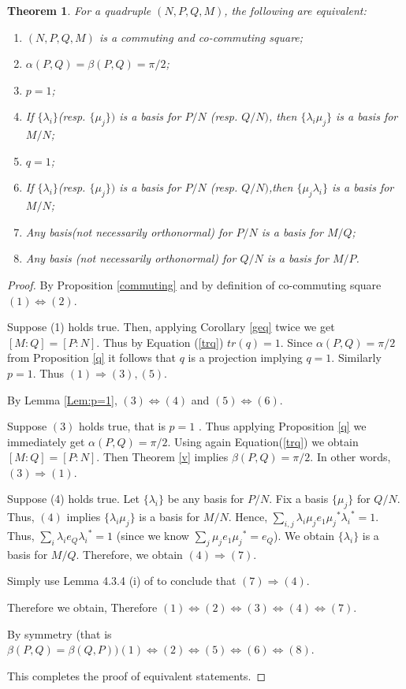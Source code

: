 \documentclass[11pt,letterpaper]{amsart}
\newtheorem{theorem}{Theorem}[section]
\theoremstyle{definition}
\theoremstyle{remark}
\begin{document}
\begin{theorem}\label{sym}
 For a quadruple $(N,P,Q,M)$, the following are equivalent:
 \begin{enumerate}
  \item $(N,P,Q,M)$ is a commuting and co-commuting square; 
  \item  $\alpha(P,Q)= \beta(P,Q)= \pi/2$;
  \item $p=1$;
  \item  If $\{\lambda_i\}$(resp. $\{\mu_j\})$ is a basis for $P/N$ (resp. $Q/N)$, then $ \{\lambda_i \mu_j\}$ is a basis for $M/N$;
  \item $q=1$;
  \item  If $\{\lambda_i\}$(resp. $\{\mu_j\})$ is a basis for $P/N$ (resp. $Q/N)$,then  $ \{\mu_j \lambda_i\}$ is a basis for $M/N$;
  
  \item  Any basis(not necessarily orthonormal) for $P/N$ is a basis for $M/Q$;
  \item  Any basis (not necessarily orthonormal) for $Q/N$ is a basis for $M/P$.
         
 \end{enumerate}
 \end{theorem}
 
 \begin{proof}
  By Proposition \ref{commuting} and by definition of co-commuting square $(1) \iff (2)$.
  
 Suppose (1) holds true. Then, applying Corollary \ref{geq} twice we get $[M:Q]=[P:N]$. Thus by Equation (\ref{trq}) $tr(q)=1$. 
 Since $\alpha(P,Q)=\pi/2$ from Proposition \ref{q} it follows that $q$ is  a projection implying $q=1$. Similarly $p=1$.
 Thus $(1)\Rightarrow (3),(5).$
 
 
By Lemma \ref{Lem:p=1}, $(3)\iff (4)$ and $(5)\iff (6)$. 

 
  
Suppose $(3)$ holds true, that is  $p=1$ . Thus applying Proposition \ref{q} we immediately get $\alpha(P,Q)=\pi/2$. 
Using again Equation(\ref{trq}) we obtain $[M:Q]=[P:N]$.
 Then Theorem \ref{v} implies $\beta(P,Q) = \pi/2$. In other words, $(3)\Rightarrow (1)$.
 

 Suppose (4) holds true. Let $\{\lambda_i\}$ be any basis for $P/N$. Fix a basis $\{\mu_j\}$ for $Q/N$.
 Thus, $(4)$ implies $\{\lambda_i\mu_j\}$ is a basis for $M/N$.
 Hence, $\sum_{i,j} \lambda_i \mu_j e_1 {\mu_j}^*{\lambda_i}^*=1$. Thus, $\sum_i \lambda_i e_Q {\lambda_i}^*=1$ (since we know $\sum_j \mu_j e_1{\mu_j}^*=e_Q$). We obtain $\{\lambda_i\}$ is a basis for $M/Q$.
 Therefore, we obtain $(4) \Rightarrow (7).$
 
  
 
 Simply use Lemma 4.3.4 (i) of \cite{JS} to conclude that $(7) \Rightarrow (4)$.
 
 
 Therefore we obtain, Therefore $(1) \iff (2) \iff (3) \iff (4)\iff (7)$.
 
 By symmetry (that is $\beta(P,Q)= \beta(Q,P)) (1) \iff (2) \iff (5) \iff (6)\iff (8)$.
 
 This completes the proof of equivalent statements.
 \end{proof}
\end{document}

